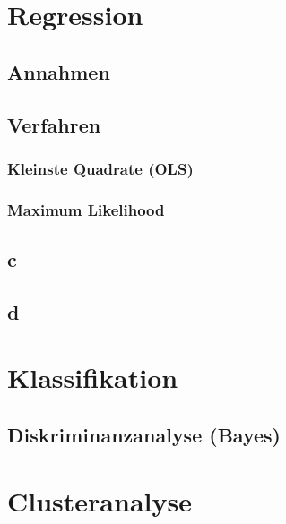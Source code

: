 \documentclass[10pt]{article}
\begin{document}


\section{Regression}

\subsection{Annahmen}

\subsection{Verfahren}
\subsubsection{Kleinste Quadrate (OLS)}
\subsubsection{Maximum Likelihood}

\subsection{c}

\subsection{d}




\section{Klassifikation}

\subsection{Diskriminanzanalyse (Bayes)}

\section{Clusteranalyse}
\end{document}
